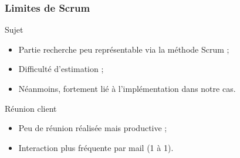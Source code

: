 \begin{frame}
\frametitle{Limites de Scrum}

\begin{block}{Sujet}
\begin{itemize}
\item Partie recherche peu représentable via la méthode Scrum ;
\item Difficulté d'estimation ;
\item Néanmoins, fortement lié à l'implémentation dans notre cas.
\end{itemize}
\end{block}
\pause
\begin{block}{Réunion client}
\begin{itemize}
\item Peu de réunion réalisée mais productive ;
\item Interaction plus fréquente par mail (1 à 1).
\end{itemize}
\end{block}

\end{frame}
